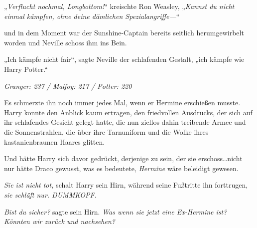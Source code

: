 „\emph{Verflucht nochmal, Longbottom!}“ kreischte Ron Weasley, „\emph{Kannst du nicht einmal kämpfen, ohne deine dämlichen Spezialangriffe—}“

und in dem Moment war der Sunshine-Captain bereits seitlich herumgewirbelt worden und Neville schoss ihm ins Bein.

„Ich kämpfe nicht fair“, sagte Neville der schlafenden Gestalt, „ich kämpfe wie Harry Potter.“

\later

\emph{Granger: 237 / Malfoy: 217 / Potter: 220}

Es schmerzte ihn noch immer jedes Mal, wenn er Hermine erschießen musste. Harry konnte den Anblick kaum ertragen, den friedvollen Ausdrucks, der sich auf ihr schlafendes Gesicht gelegt hatte, die nun ziellos dahin treibende Armee und die Sonnenstrahlen, die über ihre Tarnuniform und die Wolke ihres kastanienbraunen Haares glitten.

Und hätte Harry sich davor gedrückt, derjenige zu sein, der sie erschoss…nicht nur hätte Draco gewusst, was es bedeutete, \emph{Hermine} wäre beleidigt gewesen.

\emph{Sie ist nicht tot,} schalt Harry sein Hirn, während seine Fußtritte ihn forttrugen, \emph{sie schläft nur. DUMMKOPF.}

\emph{Bist du sicher?} sagte sein Hirn. \emph{Was wenn sie jetzt eine Ex-Hermine ist? Könnten wir zurück und nachsehen?}%

